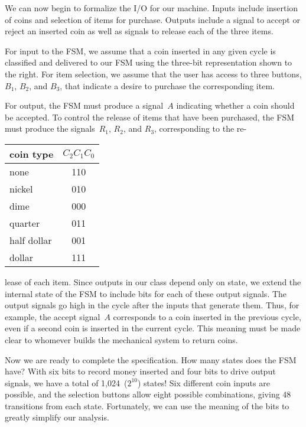 We can now begin to formalize the I/O for our machine.  Inputs include 
insertion of coins and selection of items for purchase.  Outputs include
a signal to accept or reject an inserted coin as well as signals to release
each of the three items.

\begin{minipage}{4.8in}
For input to the FSM, we assume that a coin inserted in any given cycle 
is classified and delivered to our FSM using the three-bit representation 
shown to the right.
%
For item selection, we assume that the user has access to three buttons,
$B_1$, $B_2$, and $B_3$, that indicate a desire to purchase the 
corresponding item.\mpline

For output, the FSM must produce a signal~$A$ indicating whether a coin
should be accepted.  To control the release of items that have been purchased,
the FSM must produce the signals~$R_1$, $R_2$, and $R_3$, corresponding
to the re-\linebreak
\end{minipage}\hspace{0.25in}%
\begin{minipage}{1.45in}
\begin{tabular}{l|c}
\multicolumn{1}{c|}{coin type}& $C_2C_1C_0$\\ \hline
none&        110\\
nickel&      010\\
dime&        000\\
quarter&     011\\
half dollar& 001\\
dollar&      111\\
\end{tabular}\vspace{12pt}
\end{minipage}\mpdone

lease of each item.  Since outputs in our class depend only on
state, we extend the internal state of the FSM to include bits for each of
these output signals.  The output signals go high in the cycle after
the inputs that generate them.  Thus, for example, the accept signal~$A$
corresponds to a coin inserted in the previous cycle, even if a second
coin is inserted in the current cycle.  This meaning must be made clear to
whomever builds the mechanical system to return coins.

Now we are ready to complete the specification.  How many states does the
FSM have?  With six bits to record money inserted and four bits to 
drive output signals, we have a total of 1,024~($2^{10}$) states!
Six different coin inputs are possible, and the selection buttons allow
eight possible combinations, giving 48 transitions from each state.
Fortunately, we can use the meaning of the bits to greatly simplify
our analysis.

